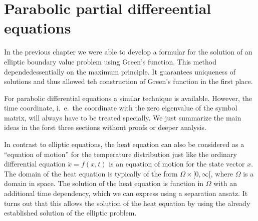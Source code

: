 %
%
%
\chapter{Parabolic partial differeential equations
\label{chapter-parabolisch}}
\rhead{}
In the previous chapter we were able to develop a formular for the
solution of an elliptic boundary value problem using Green's 
function.
This method dependedessentially on the maximum principle.
It guarantees uniqueness of solutions and thus allowed teh
construction of Green's function in the first place.

For parabolic differential equations a similar technique is
available.
However, the time coordinate, i.~e.~the coordinate with 
the zero eigenvalue of the symbol matrix, will always have to be
treated specially.
We just summarize the main ideas in the forst three sections
without proofs or deeper analysis.

In contrast to elliptic equations, the heat equation can also be
considered as a ``equation of motion'' for the temperature distribution
just like the ordinary differential equation $\dot x=f(x,t)$ is an
equation of motion for the state vector $x$.
The domain of the heat equation is typically of the form
$\Omega\times[0,\infty[$, where $\Omega$ is a domain in space.
The solution of the heat equation is function in $\Omega$ with 
an additional time dependency, which we can express using a
separation ansatz.
It turns out that this allows the solution of the heat equation
by using the already established solution of the elliptic problem.








